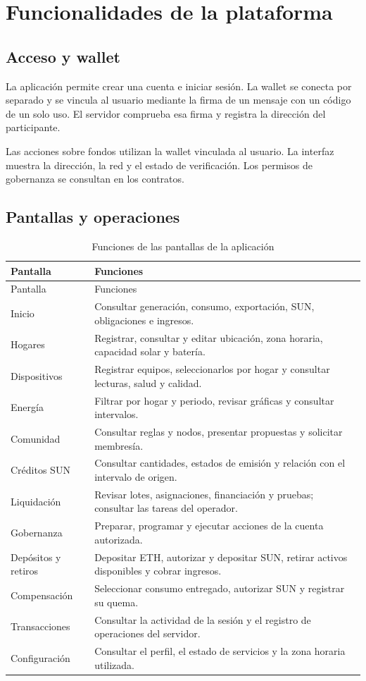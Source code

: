 \section{Funcionalidades de la plataforma}
\subsection{Acceso y wallet}
La aplicación permite crear una cuenta e iniciar sesión. La wallet se conecta por separado y se vincula al usuario mediante la firma de un mensaje con un código de un solo uso. El servidor comprueba esa firma y registra la dirección del participante.

Las acciones sobre fondos utilizan la wallet vinculada al usuario. La interfaz muestra la dirección, la red y el estado de verificación. Los permisos de gobernanza se consultan en los contratos.

\subsection{Pantallas y operaciones}
\begin{longtable}{L{.23\linewidth}L{.67\linewidth}}
\caption{Funciones de las pantallas de la aplicación}\label{tab:funcionalidades}\\
\toprule Pantalla & Funciones \\ \midrule\endfirsthead
\toprule Pantalla & Funciones \\ \midrule\endhead
Inicio & Consultar generación, consumo, exportación, SUN, obligaciones e ingresos.\\
Hogares & Registrar, consultar y editar ubicación, zona horaria, capacidad solar y batería.\\
Dispositivos & Registrar equipos, seleccionarlos por hogar y consultar lecturas, salud y calidad.\\
Energía & Filtrar por hogar y periodo, revisar gráficas y consultar intervalos.\\
Comunidad & Consultar reglas y nodos, presentar propuestas y solicitar membresía.\\
Créditos SUN & Consultar cantidades, estados de emisión y relación con el intervalo de origen.\\
Liquidación & Revisar lotes, asignaciones, financiación y pruebas; consultar las tareas del operador.\\
Gobernanza & Preparar, programar y ejecutar acciones de la cuenta autorizada.\\
Depósitos y retiros & Depositar ETH, autorizar y depositar SUN, retirar activos disponibles y cobrar ingresos.\\
Compensación & Seleccionar consumo entregado, autorizar SUN y registrar su quema.\\
Transacciones & Consultar la actividad de la sesión y el registro de operaciones del servidor.\\
Configuración & Consultar el perfil, el estado de servicios y la zona horaria utilizada.\\
\bottomrule
\end{longtable}

